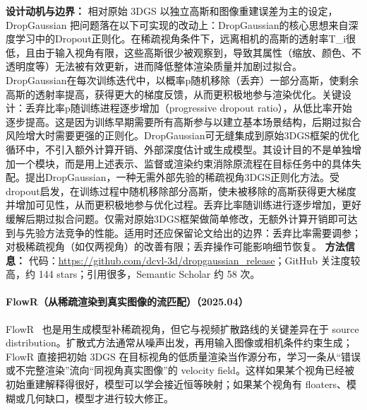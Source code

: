 \textbf{设计动机与边界：} 相对原始 3DGS 以独立高斯和图像重建误差为主的设定，DropGaussian 把问题落在以下可实现的改动上：DropGaussian的核心思想来自深度学习中的Dropout正则化。在稀疏视角条件下，远离相机的高斯的透射率T\_i很低，且由于输入视角有限，这些高斯很少被观察到，导致其属性（缩放、颜色、不透明度等）无法被有效更新，进而降低整体渲染质量并加剧过拟合。DropGaussian在每次训练迭代中，以概率p随机移除（丢弃）一部分高斯，使剩余高斯的透射率提高，获得更大的梯度反馈，从而更积极地参与渲染优化。关键设计：丢弃比率p随训练进程逐步增加（progressive dropout ratio），从低比率开始逐步提高。这是因为训练早期需要所有高斯参与以建立基本场景结构，后期过拟合风险增大时需要更强的正则化。DropGaussian可无缝集成到原始3DGS框架的优化循环中，不引入额外计算开销、外部深度估计或生成模型。其设计目的不是单独增加一个模块，而是用上述表示、监督或渲染约束消除原流程在目标任务中的具体失配。提出DropGaussian，一种无需外部先验的稀疏视角3DGS正则化方法。受dropout启发，在训练过程中随机移除部分高斯，使未被移除的高斯获得更大梯度并增加可见性，从而更积极地参与优化过程。丢弃比率随训练进行逐步增加，更好缓解后期过拟合问题。仅需对原始3DGS框架做简单修改，无额外计算开销即可达到与先验方法竞争的性能。适用时还应保留论文给出的边界：丢弃比率需要调参；对极稀疏视角（如仅两视角）的改善有限；丢弃操作可能影响细节恢复。
\textbf{方法信息：} 代码：\url{https://github.com/dcvl-3d/dropgaussian_release}；GitHub 关注度较高，约 144 stars；引用很多，Semantic Scholar 约 58 次。



\paragraph{FlowR（从稀疏渲染到真实图像的流匹配）（2025.04）}
FlowR~\cite{2504_01647} 也是用生成模型补稀疏视角，但它与视频扩散路线的关键差异在于 source distribution。扩散式方法通常从噪声出发，再用输入图像或相机条件约束生成；FlowR 直接把初始 3DGS 在目标视角的低质量渲染当作源分布，学习一条从“错误或不完整渲染”流向“同视角真实图像”的 velocity field。这样如果某个视角已经被初始重建解释得很好，模型可以学会接近恒等映射；如果某个视角有 floaters、模糊或几何缺口，模型才进行较大修正。

